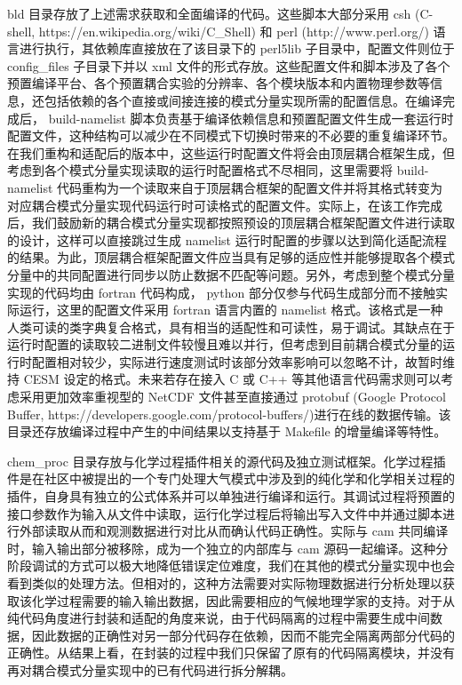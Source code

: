 bld 目录存放了上述需求获取和全面编译的代码。这些脚本大部分采用 csh (C-shell, https://en.wikipedia.org/wiki/C\_Shell) 和 perl (http://www.perl.org/) 语言进行执行，其依赖库直接放在了该目录下的 perl5lib 子目录中，配置文件则位于 config\_files 子目录下并以 xml 文件的形式存放。这些配置文件和脚本涉及了各个预置编译平台、各个预置耦合实验的分辨率、各个模块版本和内置物理参数等信息，还包括依赖的各个直接或间接连接的模式分量实现所需的配置信息。在编译完成后， build-namelist 脚本负责基于编译依赖信息和预置配置文件生成一套运行时配置文件，这种结构可以减少在不同模式下切换时带来的不必要的重复编译环节。在我们重构和适配后的版本中，这些运行时配置文件将会由顶层耦合框架生成，但考虑到各个模式分量实现读取的运行时配置格式不尽相同，这里需要将 build-namelist 代码重构为一个读取来自于顶层耦合框架的配置文件并将其格式转变为对应耦合模式分量实现代码运行时可读格式的配置文件。实际上，在该工作完成后，我们鼓励新的耦合模式分量实现都按照预设的顶层耦合框架配置文件进行读取的设计，这样可以直接跳过生成 namelist 运行时配置的步骤以达到简化适配流程的结果。为此，顶层耦合框架配置文件应当具有足够的适应性并能够提取各个模式分量中的共同配置进行同步以防止数据不匹配等问题。另外，考虑到整个模式分量实现的代码均由 fortran 代码构成， python 部分仅参与代码生成部分而不接触实际运行，这里的配置文件采用 fortran 语言内置的 namelist 格式。该格式是一种人类可读的类字典复合格式，具有相当的适配性和可读性，易于调试。其缺点在于运行时配置的读取较二进制文件较慢且难以并行，但考虑到目前耦合模式分量的运行时配置相对较少，实际进行速度测试时该部分效率影响可以忽略不计，故暂时维持 CESM 设定的格式。未来若存在接入 C 或 C++ 等其他语言代码需求则可以考虑采用更加效率重视型的 NetCDF 文件甚至直接通过 protobuf (Google Protocol Buffer, https://developers.google.com/protocol-buffers/)进行在线的数据传输。该目录还存放编译过程中产生的中间结果以支持基于 Makefile 的增量编译等特性。

chem\_proc 目录存放与化学过程插件相关的源代码及独立测试框架。化学过程插件是在社区中被提出的一个专门处理大气模式中涉及到的纯化学和化学相关过程的插件，自身具有独立的公式体系并可以单独进行编译和运行。其调试过程将预置的接口参数作为输入从文件中读取，运行化学过程后将输出写入文件中并通过脚本进行外部读取从而和观测数据进行对比从而确认代码正确性。实际与 cam 共同编译时，输入输出部分被移除，成为一个独立的内部库与 cam 源码一起编译。这种分阶段调试的方式可以极大地降低错误定位难度，我们在其他的模式分量实现中也会看到类似的处理方法。但相对的，这种方法需要对实际物理数据进行分析处理以获取该化学过程需要的输入输出数据，因此需要相应的气候地理学家的支持。对于从纯代码角度进行封装和适配的角度来说，由于代码隔离的过程中需要生成中间数据，因此数据的正确性对另一部分代码存在依赖，因而不能完全隔离两部分代码的正确性。从结果上看，在封装的过程中我们只保留了原有的代码隔离模块，并没有再对耦合模式分量实现中的已有代码进行拆分解耦。

